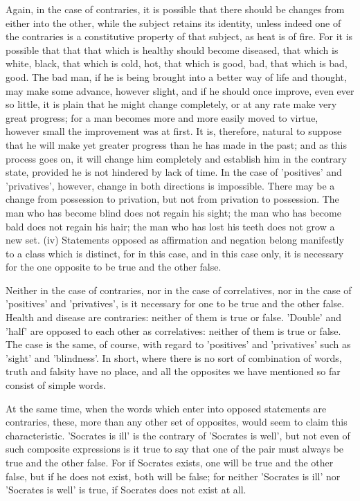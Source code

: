 Again, in the case of contraries, it is possible that there should be
changes from either into the other, while the subject retains its
identity, unless indeed one of the contraries is a constitutive
property of that subject, as heat is of fire. For it is possible that
that that which is healthy should become diseased, that which is white,
black, that which is cold, hot, that which is good, bad, that which is
bad, good. The bad man, if he is being brought into a better way of
life and thought, may make some advance, however slight, and if he
should once improve, even ever so little, it is plain that he might
change completely, or at any rate make very great progress; for a man
becomes more and more easily moved to virtue, however small the
improvement was at first. It is, therefore, natural to suppose that he
will make yet greater progress than he has made in the past; and as
this process goes on, it will change him completely and establish him
in the contrary state, provided he is not hindered by lack of time. In
the case of 'positives' and 'privatives', however, change in both
directions is impossible. There may be a change from possession to
privation, but not from privation to possession. The man who has become
blind does not regain his sight; the man who has become bald does not
regain his hair; the man who has lost his teeth does not grow a new
set. (iv) Statements opposed as affirmation and negation belong
manifestly to a class which is distinct, for in this case, and in this
case only, it is necessary for the one opposite to be true and the
other false.

Neither in the case of contraries, nor in the case of correlatives, nor
in the case of 'positives' and 'privatives', is it necessary for one to
be true and the other false. Health and disease are contraries: neither
of them is true or false. 'Double' and 'half' are opposed to each other
as correlatives: neither of them is true or false. The case is the
same, of course, with regard to 'positives' and 'privatives' such as
'sight' and 'blindness'. In short, where there is no sort of
combination of words, truth and falsity have no place, and all the
opposites we have mentioned so far consist of simple words.

At the same time, when the words which enter into opposed statements
are contraries, these, more than any other set of opposites, would seem
to claim this characteristic. 'Socrates is ill' is the contrary of
'Socrates is well', but not even of such composite expressions is it
true to say that one of the pair must always be true and the other
false. For if Socrates exists, one will be true and the other false,
but if he does not exist, both will be false; for neither 'Socrates is
ill' nor 'Socrates is well' is true, if Socrates does not exist at all.

